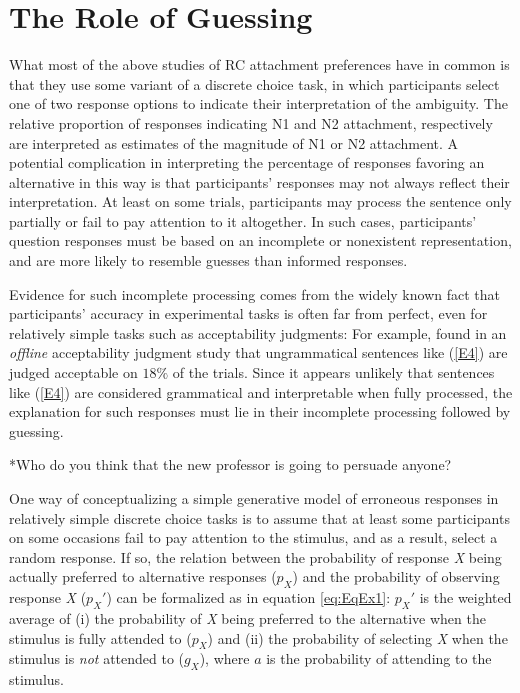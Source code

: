 \documentclass[11pt]{article}\usepackage[]{graphicx}\usepackage[]{color}
\begin{document}
\section{The Role of Guessing}

What most of the above studies of RC attachment preferences have in common is that they use some variant of a discrete choice task, in which participants select one of two response options to indicate their interpretation of the ambiguity. The relative proportion of responses indicating N1 and N2 attachment, respectively are interpreted as estimates of the magnitude of N1 or N2 attachment.
A potential complication in interpreting the percentage of responses favoring an alternative in this way is that participants' responses may not always reflect their interpretation. At least on some trials, participants may process the sentence only partially or fail to pay attention to it altogether. In such cases, participants' question responses must be based on an incomplete or nonexistent representation, 
and are more likely to resemble guesses than informed responses.

Evidence for such incomplete processing comes from the widely known fact that participants' accuracy in experimental tasks is often far from perfect, even for relatively simple tasks such as acceptability judgments: For example, \citet{DillonWagers:2019} found in an \textit{offline} acceptability judgment study that ungrammatical sentences like (\ref{E4}) are judged acceptable on $18\%$ of the trials. 
Since it appears unlikely that sentences like (\ref{E4}) are considered grammatical and interpretable when fully processed, the explanation for such responses must lie in their incomplete processing followed by guessing.

\begin{exe}
\ex \label{E4} *Who do you think that the new professor is going to persuade anyone?
\end{exe}

One way of conceptualizing a simple generative model of erroneous responses in relatively simple discrete choice tasks is to assume that at least some participants on some occasions fail to pay attention to the stimulus, and as a result, select a random response. 
If so, the relation between the probability of response \textit{X}  being actually preferred to alternative responses ($p_X$) and the probability of observing response \textit{X} ($p_X'$) can be formalized as in equation \ref{eq:EqEx1}: 
$p_{X}'$ is the weighted average of (i) the probability of \textit{X} being preferred to the alternative when the stimulus is fully attended to ($p_{X}$) and (ii) the probability of selecting \textit{X} when the stimulus is \textit{not} attended to ($g_X$), where $a$ is the probability of attending to the stimulus.
\end{document}
